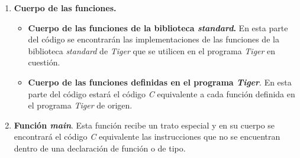 \documentclass{article}
\begin{document}
\begin{enumerate}
    \item \textbf{Cuerpo de las funciones.}
    \begin{itemize}
        \item \textbf{Cuerpo de las funciones de la biblioteca \emph{standard}.}
        En esta parte del código se encontrarán las implementaciones de las
        funciones de la biblioteca \emph{standard} de \textit{Tiger} que se
        utilicen en el programa \emph{Tiger} en cuestión.
        \item \textbf{Cuerpo de las funciones definidas en el programa
        \emph{Tiger}}. En esta parte del código estará el código \textit{C}
        equivalente a cada función definida en el programa \textit{Tiger} de
        origen.
    \end{itemize}
    
    \item \textbf{Función \textit{main}}. Esta función recibe un trato especial
    y en su cuerpo se encontrará el código \textit{C} equivalente las
    instrucciones que no se encuentran dentro de una declaración de función o
    de tipo.
\end{enumerate}
\end{document}
